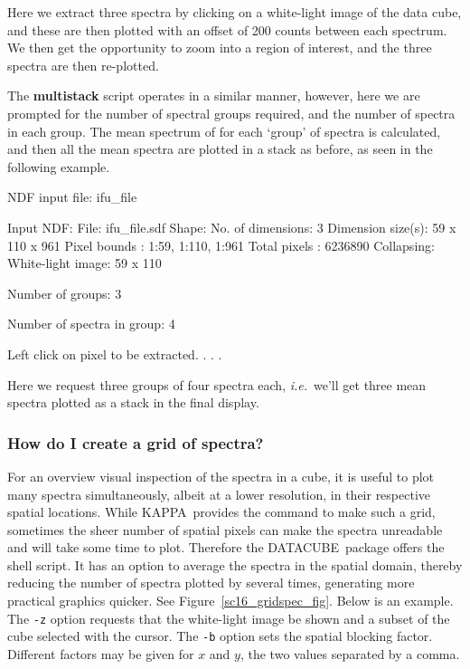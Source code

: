 \documentclass[twoside,11pt]{starlink}
\providecommand{\DATACUBE}{{\footnotesize DATACUBE}\normalsize}
\providecommand{\KAPPA}{{\footnotesize KAPPA}\normalsize}
\begin{document}
Here we extract three spectra by clicking on a white-light image of
the data cube, and these are then plotted with an offset of 200 counts
between each spectrum.  We then get the opportunity to zoom into a
region of interest, and the three spectra are then re-plotted.

The \textbf{multistack} script operates in a similar manner, however, here
we are prompted for the number of spectral groups required, and the
number of spectra in each group.  The mean spectrum of for each
`group' of spectra is calculated, and then all the mean spectra are
plotted in a stack as before, as seen in the following example.

\begin{small}
\begin{terminalv}
NDF input file: ifu_file

     Input NDF:
       File: ifu_file.sdf
     Shape:
       No. of dimensions: 3
       Dimension size(s): 59 x 110 x 961
       Pixel bounds     : 1:59, 1:110, 1:961
       Total pixels     : 6236890
     Collapsing:
       White-light image: 59 x 110

Number of groups: 3

Number of spectra in group: 4

 Left click on pixel to be extracted.
            .
            .
            .
\end{terminalv}
\end{small}

Here we request three groups of four spectra each, \emph{i.e.}\ we'll
get three mean spectra plotted as a stack in the final display.

\subsubsection{\label{sc16_gridmap}How do I create a grid of
spectra?}

For an overview visual inspection of the spectra in a cube, it is useful
to plot many spectra simultaneously, albeit at a lower resolution, in
their respective spatial locations.  While \KAPPA\ provides the
 command to make such a grid, sometimes
the sheer number of spatial pixels can make the spectra unreadable and
will take some time to plot.  Therefore the \DATACUBE\ package
offers the  shell script.  It
has an option to average the spectra in the spatial domain, thereby
reducing the number of spectra plotted by several times, generating
more practical graphics quicker.   See
Figure~\ref{sc16_gridspec_fig}.  Below is an
example.  The \texttt{-z} option requests that the white-light image be
shown and a subset of the cube selected with the cursor. The \texttt{-b}
option sets the spatial blocking factor.  Different factors may be
given for $x$ and $y$, the two values separated by a comma.
\end{document}
